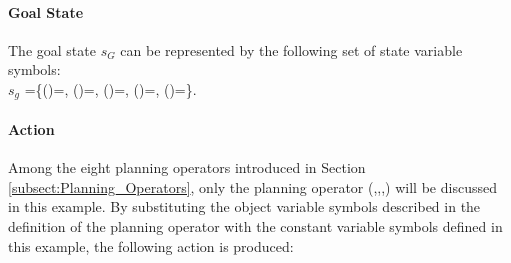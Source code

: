 \begin{comment}
In the initial state $s_0$, the $\mathsf{Robot}$ $\mathrm{r_1}$ is not equipped with any $\mathsf{EndEffector}$ and is not holding anything. The $\mathsf{EndEffectors}$ $\mathrm{eeff_1}$ and $\mathrm{eeff_2}$ are placed in the $\mathsf{EndEffectorHolders}$ $\mathrm{eeffholder_1}$ and $\mathrm{eeffholder_2}$, respectively. The $\mathsf{LargeBoxWithKits}$ $\mathrm{lbwk_1}$ is not full. The $\mathsf{LargeBoxWithEmptyKitTrays}$ $\mathrm{lbwekt_1}$ is not empty. The $\mathsf{PartTrays}$ $\mathrm{pt_A}$, $\mathrm{pt_B}$, and $\mathrm{pt_C}$ are not empty. The $\mathsf{WorkTable}$ $\mathrm{wtable}$ is free of any object.
\end{comment}



\paragraph{Goal State}
\begin{comment}
The goal state $s_g$, the $\mathsf{KitInstance}$ $\mathrm{kins_1}$ contains $\mathsf{Parts}$ $\mathrm{p_{A-1}}$, $\mathrm{p_{A-2}}$, $\mathrm{p_{B-1}}$, and $\mathrm{p_{C-1}}$. The $\mathsf{KitInstance}$ $\mathrm{kins_1}$ is placed in the $\mathsf{LargeBoxWithKits}$ $\mathrm{lbwk_1}$.
\end{comment}
The goal state $s_G$ can be represented by the following set of state variable symbols:\\
$s_g$ =\{()=, ()=, ()=, ()=,   ()=\}.

\paragraph{Action}
Among the eight planning operators introduced in Section \ref{subsect:Planning_Operators}, only the planning operator (,,,) will be discussed in this example. By substituting the object variable symbols described in the definition of the planning operator  with the constant variable symbols defined in this example, the following action is produced:

